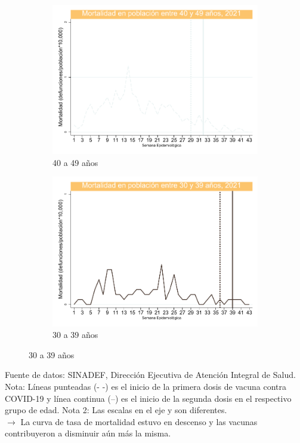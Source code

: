 \documentclass[xcolor=table]{beamer}
\begin{document}
\begin{frame}
\begin{figure}
\begin{subfigure}[b]{0.3\textwidth}
	\includegraphics[width=\textwidth]{../figuras/mortalidad_edad_40.pdf}
	\caption{40 a 49 años}
\end{subfigure}
\hfill
\begin{subfigure}[b]{0.3\textwidth}
	\centering
	\includegraphics[width=\textwidth]{../figuras/mortalidad_edad_30.pdf}
	\caption{30 a 39 años}
\end{subfigure}
\end{figure}
\vspace{-.8cm}
		{\tiny Fuente de datos: SINADEF, Dirección Ejecutiva de Atención Integral de Salud.\\}
		{\tiny Nota: Líneas punteadas (- -) es el inicio de la primera dosis de vacuna contra COVID-19 y línea continua (--) es el inicio de la segunda dosis en el respectivo grupo de edad. Nota 2: Las escalas en el eje y son diferentes.\\}
		$\rightarrow$ {\small La curva de tasa de mortalidad estuvo en descenso y las vacunas contribuyeron a disminuir aún más la misma.} \hyperlink{indice}{}
\end{frame}
\end{document}
